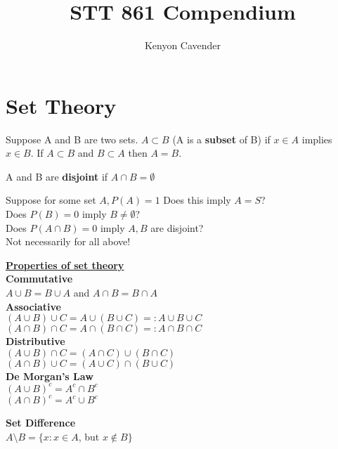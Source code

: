 \documentclass[14pt, oneside, letterpaper]{notes}
\begin{document}
\title{STT 861 Compendium}
\author{Kenyon Cavender}
\maketitle

\section*{Set Theory}
\begin{mydef}
  Suppose A and B are two sets.  $A \subset B$ (A is a 
  \textbf{subset} of B) if $x \in A$ implies $x \in B$. 
  If $A \subset B$ and $B \subset A$ then $A=B$.
\end{mydef}

\begin{mydef}
  A and B are \textbf{disjoint} if $A \cap B = \emptyset$
\end{mydef}

\begin{remark}
	Suppose for some set $A, P(A) = 1$ Does this imply $A=S$? \\
	Does $P(B) = 0$ imply $B \neq \emptyset$? \\
	Does $P(A \cap B) = 0$ imply $A,B$ are disjoint? \\
	Not necessarily for all above! 
\end{remark}

\noindent \underline{\textbf{Properties of set theory}}  \\
\textbf{Commutative}  \\
\indent $A \cup B = B \cup A$ and $A \cap B = B \cap A$ \\
\textbf{Associative}\\
\indent $(A \cup B) \cup C = A \cup (B \cup C) =: A \cup B \cup C$ \\
\indent $(A \cap B) \cap C = A \cap (B \cap C) =: A \cap B \cap C$ \\
\textbf{Distributive}\\
\indent $(A \cup B) \cap C = (A \cap C) \cup (B \cap C)$ \\
\indent $(A \cap B) \cup C = (A \cup C) \cap (B \cup C)$ \\
\textbf{De Morgan's Law}\\
\indent $(A \cup B)^c = A^c \cap B^c$ \\
\indent $(A \cap B)^c = A^c \cup B^c$ 

\begin{mydef}
  \textbf{Set Difference}\\
  \indent $A \setminus B = \{x: x \in A$, but $x \notin B \}$
\end{mydef}
\end{document}
